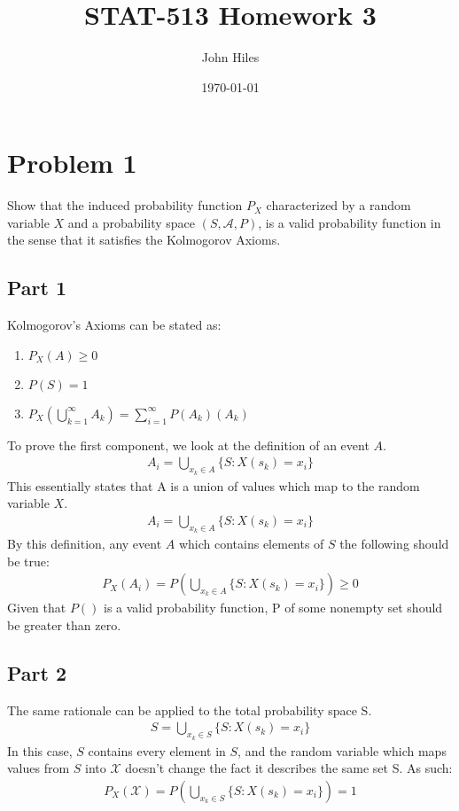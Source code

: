 \documentclass{article}
\title{STAT-513 Homework 3}
\author{John Hiles}
\date\today
\begin{document}
\maketitle %


\section*{Problem 1}

Show that the induced probability function $P_X$ characterized by a random variable $X$ and a probability space $(S,\mathcal{A},P)$, is a valid probability function in the sense that it satisfies the Kolmogorov Axioms.

\subsection*{Part 1}
Kolmogorov's Axioms can be stated as:
\begin{enumerate}
\item
$P_X(A)\geq 0$
\item
$P(S)=1$
\item
$P_X(\bigcup_{k=1}^{\infty}A_k)=\sum_{i=1}^{\infty}P(A_k)(A_k)$
\end{enumerate}

To prove the first component, we look at the definition of an event $A$.
\begin{align*}
A_i = \bigcup_{x_k\in A}\{S:X(s_k)=x_i\}
\end{align*}
This essentially states that A is a union of values which map to the random variable $X$.
\begin{align*}
A_i = \bigcup_{x_k\in A}\{S:X(s_k)=x_i\}
\end{align*}
By this definition, any event $A$ which contains elements of $S$ the following should be true:
\begin{align*}
\boxed{P_X(A_i) = P(\bigcup_{x_k\in A}\{S:X(s_k)=x_i\}) \geq 0}
\end{align*}
Given that $P()$ is a valid probability function, P of some nonempty set should be greater than zero.
\subsection*{Part 2}
The same rationale can be applied to the total probability space S.
\begin{align*}
S = \bigcup_{x_k\in S}\{S:X(s_k)=x_i\}
\end{align*}
In this case, $S$ contains every element in $S$, and the random variable which maps values from $S$ into $\mathcal{X}$ doesn't change the fact it describes the same set S. As such:
\begin{align*}
\boxed{P_X(\mathcal{X}) = P(\bigcup_{x_k\in S}\{S:X(s_k)=x_i\}) = 1}
\end{align*}
\end{document}
